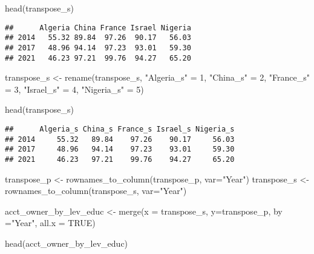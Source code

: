 \documentclass[
]{article}
\newenvironment{Shaded}{\begin{snugshade}}{\end{snugshade}}
\newcommand{\AttributeTok}[1]{\textcolor[rgb]{0.77,0.63,0.00}{#1}}
\newcommand{\ConstantTok}[1]{\textcolor[rgb]{0.00,0.00,0.00}{#1}}
\newcommand{\DecValTok}[1]{\textcolor[rgb]{0.00,0.00,0.81}{#1}}
\newcommand{\FunctionTok}[1]{\textcolor[rgb]{0.00,0.00,0.00}{#1}}
\newcommand{\NormalTok}[1]{#1}
\newcommand{\OtherTok}[1]{\textcolor[rgb]{0.56,0.35,0.01}{#1}}
\newcommand{\StringTok}[1]{\textcolor[rgb]{0.31,0.60,0.02}{#1}}
\begin{document}
\begin{Shaded}
\begin{Highlighting}[]
\FunctionTok{head}\NormalTok{(transpose\_s)}
\end{Highlighting}
\end{Shaded}

\begin{verbatim}
##      Algeria China France Israel Nigeria
## 2014   55.32 89.84  97.26  90.17   56.03
## 2017   48.96 94.14  97.23  93.01   59.30
## 2021   46.23 97.21  99.76  94.27   65.20
\end{verbatim}

\begin{Shaded}
\begin{Highlighting}[]
\NormalTok{transpose\_s }\OtherTok{\textless{}{-}} \FunctionTok{rename}\NormalTok{(transpose\_s, }\StringTok{"Algeria\_s"} \OtherTok{=} \DecValTok{1}\NormalTok{, }\StringTok{"China\_s"} \OtherTok{=} \DecValTok{2}\NormalTok{, }\StringTok{"France\_s"} \OtherTok{=} \DecValTok{3}\NormalTok{, }\StringTok{"Israel\_s"} \OtherTok{=} \DecValTok{4}\NormalTok{, }\StringTok{"Nigeria\_s"} \OtherTok{=} \DecValTok{5}\NormalTok{)}

\FunctionTok{head}\NormalTok{(transpose\_s)}
\end{Highlighting}
\end{Shaded}

\begin{verbatim}
##      Algeria_s China_s France_s Israel_s Nigeria_s
## 2014     55.32   89.84    97.26    90.17     56.03
## 2017     48.96   94.14    97.23    93.01     59.30
## 2021     46.23   97.21    99.76    94.27     65.20
\end{verbatim}

\begin{Shaded}
\begin{Highlighting}[]
\NormalTok{transpose\_p }\OtherTok{\textless{}{-}} \FunctionTok{rownames\_to\_column}\NormalTok{(transpose\_p, }\AttributeTok{var=}\StringTok{"Year"}\NormalTok{)}
\NormalTok{transpose\_s }\OtherTok{\textless{}{-}} \FunctionTok{rownames\_to\_column}\NormalTok{(transpose\_s, }\AttributeTok{var=}\StringTok{"Year"}\NormalTok{)}
\end{Highlighting}
\end{Shaded}

\begin{Shaded}
\begin{Highlighting}[]
\NormalTok{acct\_owner\_by\_lev\_educ }\OtherTok{\textless{}{-}} \FunctionTok{merge}\NormalTok{(}\AttributeTok{x =}\NormalTok{ transpose\_s, }\AttributeTok{y=}\NormalTok{transpose\_p, }\AttributeTok{by =}\StringTok{"Year"}\NormalTok{, }\AttributeTok{all.x =} \ConstantTok{TRUE}\NormalTok{)}

\FunctionTok{head}\NormalTok{(acct\_owner\_by\_lev\_educ)}
\end{Highlighting}
\end{Shaded}
\end{document}
